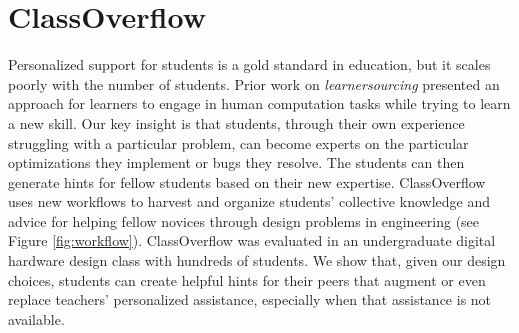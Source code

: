 \section{ClassOverflow}

Personalized support for students is a gold standard in education, but it scales poorly with the number of students. Prior work on \textit{learnersourcing} presented an approach for learners to engage in human computation tasks while trying to learn a new skill. Our key insight is that students, through their own experience struggling with a particular problem, can become experts on the particular optimizations they implement or bugs they resolve. The students can then generate hints for fellow students based on their new expertise. ClassOverflow  uses new workflows to harvest and organize students' collective knowledge and advice for helping fellow novices through design problems in engineering (see Figure \ref{fig:workflow}). ClassOverflow was evaluated in an undergraduate digital hardware design class with hundreds of students. We show that, given our design choices, students can create helpful hints for their peers that augment or even replace teachers' personalized assistance, especially when that assistance is not available.


